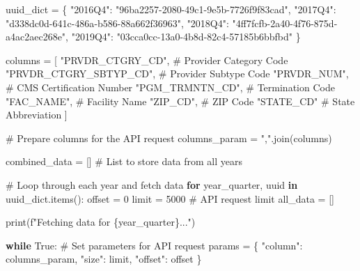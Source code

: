 \documentclass[
  letterpaper,
  DIV=11,
  numbers=noendperiod]{scrartcl}
\newenvironment{Shaded}{\begin{snugshade}}{\end{snugshade}}
\newcommand{\BuiltInTok}[1]{\textcolor[rgb]{0.00,0.23,0.31}{#1}}
\newcommand{\CommentTok}[1]{\textcolor[rgb]{0.37,0.37,0.37}{#1}}
\newcommand{\ControlFlowTok}[1]{\textcolor[rgb]{0.00,0.23,0.31}{\textbf{#1}}}
\newcommand{\DecValTok}[1]{\textcolor[rgb]{0.68,0.00,0.00}{#1}}
\newcommand{\KeywordTok}[1]{\textcolor[rgb]{0.00,0.23,0.31}{\textbf{#1}}}
\newcommand{\NormalTok}[1]{\textcolor[rgb]{0.00,0.23,0.31}{#1}}
\newcommand{\OperatorTok}[1]{\textcolor[rgb]{0.37,0.37,0.37}{#1}}
\newcommand{\SpecialCharTok}[1]{\textcolor[rgb]{0.37,0.37,0.37}{#1}}
\newcommand{\SpecialStringTok}[1]{\textcolor[rgb]{0.13,0.47,0.30}{#1}}
\newcommand{\StringTok}[1]{\textcolor[rgb]{0.13,0.47,0.30}{#1}}
\newcommand{\VariableTok}[1]{\textcolor[rgb]{0.07,0.07,0.07}{#1}}
\begin{document}
\begin{Shaded}
\begin{Highlighting}[]
\NormalTok{uuid\_dict }\OperatorTok{=}\NormalTok{ \{}
    \StringTok{"2016Q4"}\NormalTok{: }\StringTok{"96ba2257{-}2080{-}49c1{-}9e5b{-}7726f9f83cad"}\NormalTok{,}
    \StringTok{"2017Q4"}\NormalTok{: }\StringTok{"d338dc0d{-}641c{-}486a{-}b586{-}88a662f36963"}\NormalTok{,}
    \StringTok{"2018Q4"}\NormalTok{: }\StringTok{"4ff7fcfb{-}2a40{-}4f76{-}875d{-}a4ac2aec268e"}\NormalTok{,}
    \StringTok{"2019Q4"}\NormalTok{: }\StringTok{"03cca0cc{-}13a0{-}4b8d{-}82c4{-}57185b6bbfbd"}
\NormalTok{\}}

\NormalTok{columns }\OperatorTok{=}\NormalTok{ [}
    \StringTok{"PRVDR\_CTGRY\_CD"}\NormalTok{,        }\CommentTok{\# Provider Category Code}
    \StringTok{"PRVDR\_CTGRY\_SBTYP\_CD"}\NormalTok{,  }\CommentTok{\# Provider Subtype Code}
    \StringTok{"PRVDR\_NUM"}\NormalTok{,             }\CommentTok{\# CMS Certification Number}
    \StringTok{"PGM\_TRMNTN\_CD"}\NormalTok{,         }\CommentTok{\# Termination Code}
    \StringTok{"FAC\_NAME"}\NormalTok{,              }\CommentTok{\# Facility Name}
    \StringTok{"ZIP\_CD"}\NormalTok{,                }\CommentTok{\# ZIP Code}
    \StringTok{"STATE\_CD"}               \CommentTok{\# State Abbreviation}
\NormalTok{]}

\CommentTok{\# Prepare columns for the API request}
\NormalTok{columns\_param }\OperatorTok{=} \StringTok{","}\NormalTok{.join(columns)}

\NormalTok{combined\_data }\OperatorTok{=}\NormalTok{ []  }\CommentTok{\# List to store data from all years}

\CommentTok{\# Loop through each year and fetch data}
\ControlFlowTok{for}\NormalTok{ year\_quarter, uuid }\KeywordTok{in}\NormalTok{ uuid\_dict.items():}
\NormalTok{    offset }\OperatorTok{=} \DecValTok{0}
\NormalTok{    limit }\OperatorTok{=} \DecValTok{5000}  \CommentTok{\# API request limit}
\NormalTok{    all\_data }\OperatorTok{=}\NormalTok{ []}

    \BuiltInTok{print}\NormalTok{(}\SpecialStringTok{f"Fetching data for }\SpecialCharTok{\{}\NormalTok{year\_quarter}\SpecialCharTok{\}}\SpecialStringTok{..."}\NormalTok{)}

    \ControlFlowTok{while} \VariableTok{True}\NormalTok{:}
        \CommentTok{\# Set parameters for API request}
\NormalTok{        params }\OperatorTok{=}\NormalTok{ \{}
            \StringTok{"column"}\NormalTok{: columns\_param,}
            \StringTok{"size"}\NormalTok{: limit,}
            \StringTok{"offset"}\NormalTok{: offset}
\NormalTok{        \}}


\end{Highlighting}
\end{Shaded}
\end{document}
